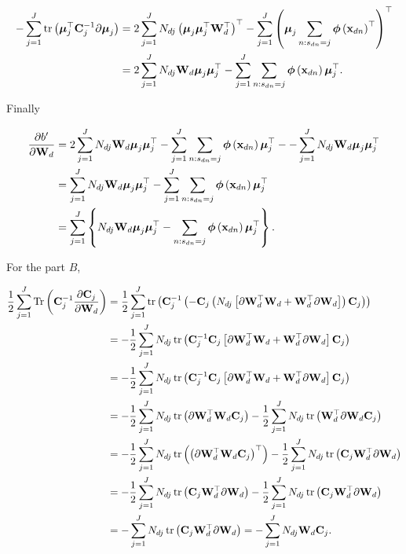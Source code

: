 	\begin{align}
	-\sum_{j=1}^{J}\operatorname{tr}\left( \boldsymbol{\mu}_j^\top\mathbf{C}_j^{-1}\partial\boldsymbol{\mu}_j\right) &= 2\sum_{j=1}^{J}N_{dj}\left(\boldsymbol{\mu}_j\boldsymbol{\mu}_j^\top\mathbf{W}_d^\top\right)^\top-\sum_{j=1}^{J}\left(\boldsymbol{\mu}_j\sum_{n:s_{dn}=j}\boldsymbol{\phi}\left(\mathbf{x}_{dn}\right)^\top\right)^\top \notag \\
	&= 2\sum_{j=1}^{J}N_{dj}\mathbf{W}_d\boldsymbol{\mu}_j\boldsymbol{\mu}_j^\top - \sum_{j=1}^{J}\sum_{n:s_{dn}=j}\boldsymbol{\phi}\left(\mathbf{x}_{dn}\right) \boldsymbol{\mu}_j^\top .
	\end{align}
	
	Finally 
	
	\begin{align}
	\frac{\partial b'}{\partial\mathbf{W}_d} &= 2\sum_{j=1}^{J}N_{dj}\mathbf{W}_d\boldsymbol{\mu}_j\boldsymbol{\mu}_j^\top - \sum_{j=1}^{J}\sum_{n:s_{dn}=j}\boldsymbol{\phi}\left(\mathbf{x}_{dn}\right) \boldsymbol{\mu}_j^\top -  -\sum_{j=1}^{J} N_{dj} \mathbf{W}_d \boldsymbol{\mu}_j\boldsymbol{\mu}_j^\top \notag \\
	&= \sum_{j=1}^{J}N_{dj}\mathbf{W}_d\boldsymbol{\mu}_j\boldsymbol{\mu}_j^\top - \sum_{j=1}^{J}\sum_{n:s_{dn}=j}\boldsymbol{\phi}\left(\mathbf{x}_{dn}\right) \boldsymbol{\mu}_j^\top \notag \\
	&= \sum_{j=1}^{J}\left\{N_{dj}\mathbf{W}_d\boldsymbol{\mu}_j\boldsymbol{\mu}_j^\top - \sum_{n:s_{dn}=j}\boldsymbol{\phi}\left(\mathbf{x}_{dn}\right) \boldsymbol{\mu}_j^\top\right\}.
	\end{align}
	
	For the part $B$,
	
	\begin{align}
	\frac{1}{2}\sum_{j=1}^{J} \operatorname{Tr}\left(\mathbf{C}_j^{-1}\frac{\partial \mathbf{C}_j}{\partial\mathbf{W}_d}\right) &= \frac{1}{2}\sum_{j=1}^{J} \operatorname{tr}\left(\mathbf{C}_j^{-1}\left(-\mathbf{C}_j\left(N_{dj}\left[\partial\mathbf{W}_d^\top\mathbf{W}_d+\mathbf{W}_d^\top\partial\mathbf{W}_d\right]\right)\mathbf{C}_j\right)\right) \notag \\
	&= -\frac{1}{2}\sum_{j=1}^{J}N_{dj}\operatorname{tr}\left(\mathbf{C}_j^{-1}\mathbf{C}_j\left[\partial\mathbf{W}_d^\top\mathbf{W}_d+\mathbf{W}_d^\top\partial\mathbf{W}_d\right]\mathbf{C}_j\right) \notag \\
	&= -\frac{1}{2}\sum_{j=1}^{J}N_{dj}\operatorname{tr}\left(\mathbf{C}_j^{-1}\mathbf{C}_j\left[\partial\mathbf{W}_d^\top\mathbf{W}_d+\mathbf{W}_d^\top\partial\mathbf{W}_d\right]\mathbf{C}_j\right) \notag \\
	&= -\frac{1}{2}\sum_{j=1}^{J}N_{dj}\operatorname{tr}\left(\partial\mathbf{W}_d^\top\mathbf{W}_d\mathbf{C}_j\right) -\frac{1}{2}\sum_{j=1}^{J}N_{dj}\operatorname{tr}\left(\mathbf{W}_d^\top\partial\mathbf{W}_d\mathbf{C}_j\right)\notag \\
	&= -\frac{1}{2}\sum_{j=1}^{J}N_{dj}\operatorname{tr}\left(\left(\partial\mathbf{W}_d^\top\mathbf{W}_d\mathbf{C}_j\right)^\top\right) -\frac{1}{2}\sum_{j=1}^{J}N_{dj}\operatorname{tr}\left(\mathbf{C}_j\mathbf{W}_d^\top\partial\mathbf{W}_d\right)\notag \\
	&= -\frac{1}{2}\sum_{j=1}^{J}N_{dj}\operatorname{tr}\left(\mathbf{C}_j\mathbf{W}_d^\top\partial\mathbf{W}_d\right) -\frac{1}{2}\sum_{j=1}^{J}N_{dj}\operatorname{tr}\left(\mathbf{C}_j\mathbf{W}_d^\top\partial\mathbf{W}_d\right)\notag \\
	&=-\sum_{j=1}^{J}N_{dj}\operatorname{tr}\left(\mathbf{C}_j\mathbf{W}_d^\top\partial\mathbf{W}_d\right)= -\sum_{j=1}^{J}N_{dj}\mathbf{W}_d\mathbf{C}_j.
	\end{align}
	
